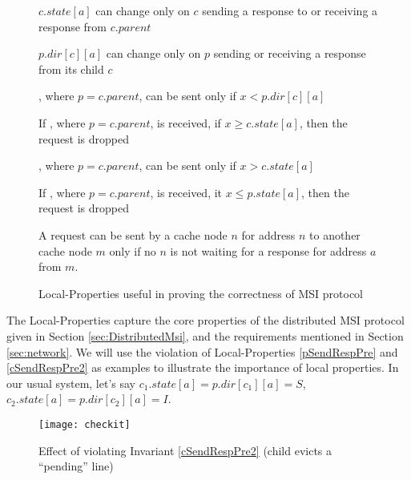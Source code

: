 \begin{figure}
\begin{inv}
$c.state[a]$ can change only on $c$ sending a response to or receiving a
response from $c.parent$\label{cState}
\end{inv}
\begin{inv}
$p.dir[c][a]$ can change only on $p$ sending or receiving a response from
its child $c$\label{pState}
\end{inv}
%
\begin{inv}
, where $p = c.parent$, can be sent only if $x < p.dir[c][a]$\label{pSendReqPre}
\end{inv}
\begin{inv}
If , where $p = c.parent$, is received, if $x \ge c.state[a]$,
then the request is dropped\label{pSendReqPost}
\end{inv}
\begin{inv}
, where $p = c.parent$, can be sent only if $x > c.state[a]$\label{cSendReqPre}
\end{inv}
\begin{inv}
If , where $p = c.parent$, is received, it $x \le p.state[a]$,
then the request is dropped\label{cSendReqPost}
\end{inv}
\begin{inv}
A request can be sent by a cache node $n$ for address $n$ to another cache node $m$ only if
no $n$ is not waiting for a response for address $a$ from $m$.
\label{nodoublereq}
\end{inv}
\caption{Local-Properties useful in proving the correctness of MSI protocol}
\label{sendReq}
\end{figure}

The Local-Properties capture the core properties of the distributed MSI
protocol given in Section \ref{sec:DistributedMsi}, and the requirements
mentioned in Section \ref{sec:network}. We will use the violation of
Local-Properties \ref{pSendRespPre} and \ref{cSendRespPre2} as examples to
illustrate the importance of local properties.  In our usual system, let's say
$c_1.state[a] = p.dir[c_1][a] = S$, $c_2.state[a] = p.dir[c_2][a] = I$.

\begin{figure}
\centering
\texttt{[image: checkit]}
\caption{Effect of violating Invariant \ref{cSendRespPre2} (child evicts a ``pending'' line)}
\label{checkit}
\end{figure}

